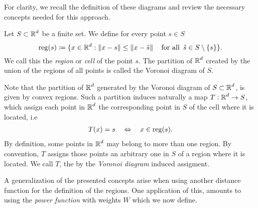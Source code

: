 \documentclass[
     12pt,         %
     a4paper,      %
     BCOR=10mm,     %
     DIV=14,        %
     ]{scrreprt}
\begin{document}
    For clarity, we recall the definition of these diagrams and review the necessary concepts needed for this approach. 
    \begin{defi}
        Let $S\subset \operatorname{\mathbb{R}}^d$ be a finite set.  We define for every point $s\in S$
        \[\reg(s) \coloneqq \{x \in \R^d : \|x-s\| \le \|x-\tilde s \| \quad  \forAll \tilde s \in S\setminus \{s\} \}. \]
        We call this the \textit{region} or \textit{cell} of the point $s$.
        The partition of $\operatorname{\mathbb{R}}^d$ created by the union of the regions of all points is called the Voronoi diagram of $S$.
    \end{defi}
    \begin{rem}
        Note that the partition of $\operatorname{\mathbb{R}}^d$ generated by the Voronoi diagram of $S\subset \operatorname{\mathbb{R}}^d$, is given by convex regions.  Such a partition induces naturally a map $T: \operatorname{\mathbb{R}}^d \to S$, which assign each point in $\operatorname{\mathbb{R}}^d$ the corresponding 
        point in $S$ of the cell where it is located, i.e
         \begin{align} \label{eq::reg}
             T(x) = s \quad \Leftrightarrow \quad x\in \operatorname{reg}(s).  
         \end{align}
         By definition, some points in $\operatorname{\mathbb{R}}^d$ may belong to more than one region.  By convention, $T$ assigns those points an arbitrary one in $S$ of a region
         where it is located. We call $T$, the by the \textit{Voronoi diagram} induced assigment. 
    \end{rem}
    A generalization of the presented concepts arise when using another distance function for the definition of the regions. 
    One application of this, amounts to using the \textit{power function} with weights $W$ which we now define.
\end{document}
